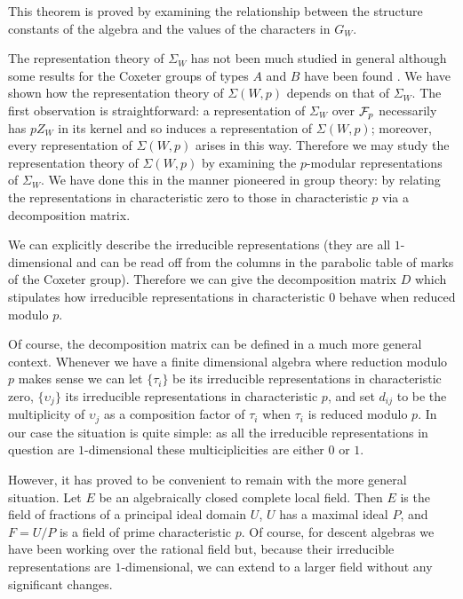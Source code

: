 \documentclass[10pt]{article}
\begin{document}
 This theorem is proved by examining the relationship between the
 structure constants of the algebra and the values of the characters
 in $G_{W}$.


The representation theory of $\Sigma_{W}$ has not been much studied in
general although some results for the Coxeter groups of types $A$ and
$B$ have been found \cite{G&R,B&B,Ber}.  We have shown how
the representation theory of $\Sigma(W,p)$ depends on that
of $\Sigma_{W}$.  The first observation is straightforward: a
representation of $\Sigma_{W}$ over ${\cal F}_{p}$ necessarily has $pZ_{W}$
in its kernel
and so induces a representation of $\Sigma(W,p)$; moreover, every
representation of $\Sigma(W,p)$ arises in this way.  Therefore we may
study the representation theory of $\Sigma(W,p)$ by examining the
$p$-modular representations of $\Sigma_{W}$.  We have done this in the manner
pioneered in group theory: by relating the representations in
characteristic zero to those in characteristic $p$ via a
decomposition matrix.

We can explicitly describe the irreducible representations (they are
all $1$-dimensional and can be read off from the
columns in the parabolic table of marks of the Coxeter group).
Therefore we can give the decomposition matrix
$D$ which stipulates how irreducible representations in
characteristic $0$ behave when reduced modulo $p$.


Of course, the decomposition matrix can be defined in a much more
general context.  Whenever we have a finite dimensional algebra where
reduction modulo $p$ makes sense we can let $\{\tau_{i}\}$ be its irreducible
representations in characteristic zero, $\{\upsilon_{j}\}$ its irreducible
representations in characteristic $p$, and set $d_{ij}$ to be the
multiplicity of $\upsilon_{j}$ as a composition factor of $\tau_{i}$ when
$\tau_{i}$ is reduced
modulo $p$.  In our case the situation is quite simple: as all the
irreducible representations in question are $1$-dimensional these
multiciplicities are either $0$ or $1$.

However, it has proved to be convenient to remain with the more general
situation.
Let $E$ be an algebraically closed complete
local field.  Then $E$ is the field of fractions of a principal ideal
domain $U$, $U$ has a maximal ideal $P$, and $F=U/P$ is a field of
prime characteristic $p$.  Of course, for descent algebras we have
been working over the rational field but, because their irreducible
representations are $1$-dimensional, we can extend to a larger field
without any significant changes.
\end{document}
